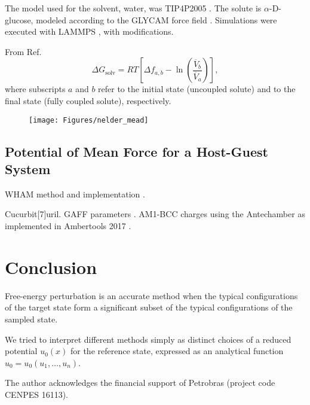 \documentclass[journal=jctcce,manuscript=article,layout=twocolumn]{achemso}
\newcommand{\avg}[1]{\overline{#1}}             %
\begin{document}
The model used for the solvent, water, was TIP4P2005 \cite{Abascal_2005}. The solute is $\alpha$-D-glucose, modeled according to the GLYCAM force field \cite{Kirschner_2007}. Simulations were executed with LAMMPS \cite{Plimpton_1995}, with modifications.



From Ref.~
\begin{equation*}
{\Delta G}_\text{solv} = RT \left[{\Delta f}_{a,b} - \ln \left(\frac{\avg{V}_b}{\avg{V}_a}\right)\right],
\end{equation*}
where subscripts $a$ and $b$ refer to the initial state (uncoupled solute) and to the final state (fully coupled solute), respectively. 

\begin{figure}
	\centering
	\texttt{[image: Figures/nelder\_mead]}
	\caption{}
	\label{fig:nelder_mead}
\end{figure}


\subsection{Potential of Mean Force for a Host-Guest System}

WHAM method\cite{Kumar_1992} and implementation \cite{Grossfield_nodate}.

Cucurbit[7]uril. GAFF parameters \cite{Wang_2004}. AM1-BCC charges \cite{Jakalian_2000, Jakalian_2002} using the Antechamber \cite{Wang_2006} as implemented in Ambertools 2017 \cite{Case_2017}.

\section{Conclusion}

Free-energy perturbation is an accurate method when the typical configurations of the target state form a significant subset of the typical configurations of the sampled state.

We tried to interpret different methods simply as distinct choices of a reduced potential $u_0(x)$ for the reference state, expressed as an analytical function $u_0 = u_0(u_1,\dots,u_n)$.

\begin{acknowledgement}

The author acknowledges the financial support of Petrobras (project code CENPES 16113).

\end{acknowledgement}
\end{document}
